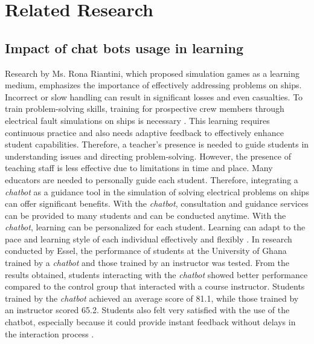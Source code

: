 \section{Related Research}
\label{sec:penelitianterkait}

\subsection{Impact of chat bots usage in learning}
Research by Ms. Rona Riantini, which proposed simulation games as a learning medium, emphasizes the importance of effectively addressing problems on ships. Incorrect or slow handling can result in significant losses and even casualties. To train problem-solving skills, training for prospective crew members through electrical fault simulations on ships is necessary \cite{riantini2022serious}. This learning requires continuous practice and also needs adaptive feedback to effectively enhance student capabilities. Therefore, a teacher's presence is needed to guide students in understanding issues and directing problem-solving. However, the presence of teaching staff is less effective due to limitations in time and place. Many educators are needed to personally guide each student. Therefore, integrating a \emph{chatbot} as a guidance tool in the simulation of solving electrical problems on ships can offer significant benefits. With the \emph{chatbot}, consultation and guidance services can be provided to many students and can be conducted anytime. With the \emph{chatbot}, learning can be personalized for each student. Learning can adapt to the pace and learning style of each individual effectively and flexibly \cite{vazquezcano2021chatbot,kumar2021educational}. In research conducted by Essel, the performance of students at the University of Ghana trained by a \emph{chatbot} and those trained by an instructor was tested. From the results obtained, students interacting with the \emph{chatbot} showed better performance compared to the control group that interacted with a course instructor. Students trained by the \emph{chatbot} achieved an average score of 81.1, while those trained by an instructor scored 65.2. Students also felt very satisfied with the use of the chatbot, especially because it could provide instant feedback without delays in the interaction process \cite{essel2022virtual}.


